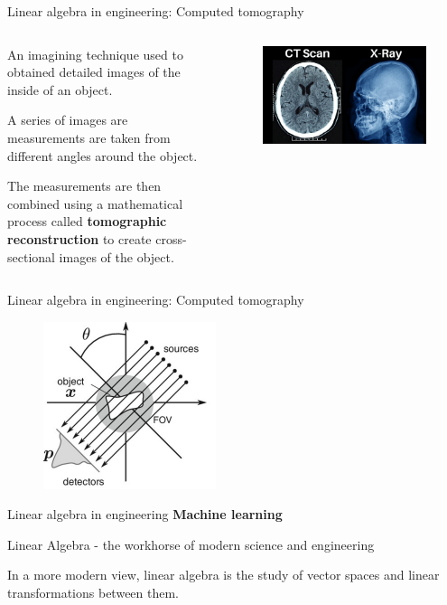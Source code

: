 \documentclass[aspectratio=169]{beamer}
\begin{document}
\begin{frame}{Linear algebra in engineering: Computed tomography}
  \begin{columns}
    \begin{column}{0.5\textwidth}
      An imagining technique used to obtained detailed images of the inside of an object.
      \vspace{0.2cm}

      A series of images are measurements are taken from different angles around the object. 
      \vspace{0.2cm}

      The measurements are then combined using a mathematical process called \textbf{tomographic reconstruction} to create cross-sectional images of the object.
    \end{column}
    \begin{column}{0.45\textwidth}
      \begin{figure}
        \centering
        \includegraphics[width=\textwidth]{ctimage.jpg}
      \end{figure}
    \end{column}    
  \end{columns}
\end{frame}


\begin{frame}{Linear algebra in engineering: Computed tomography}
  \begin{figure}
    \centering
    \includegraphics[width=0.45\textwidth]{ct_example.jpg}
  \end{figure}
\end{frame}


\begin{frame}{Linear algebra in engineering}
  \textbf{Machine learning}
  
\end{frame}


\begin{frame}{Linear Algebra - the workhorse of modern science and engineering}

  In a more modern view, linear algebra is the study of vector spaces and linear transformations between them.
\end{frame}
\end{document}
